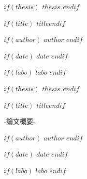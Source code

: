 \documentclass[10pt,a4paper,dvipdfmx]{jreport}
\begin{document}
    \begin{center}
    {\fontsize{38pt}{40pt}\selectfont \bf $if(thesis)$ $thesis$ $endif$ \par} %
        \vspace{5cm}

        {\fontsize{30pt}{40pt}\selectfont
        \bf $if(title)$ $title$$endif$ \par }%
        \vspace{1cm}

        {\fontsize{30pt}{40pt}\selectfont
        $if(author)$ $author$ $endif$ \par }%
        \vspace{1cm}

        {\fontsize{20pt}{10pt}\selectfont
        $if(date)$ $date$ $endif$ \par }%
        \vspace{8cm}
        {\fontsize{20pt}{10pt}\selectfont
        $if(labo)$ $labo$ $endif$ \par }

    \end{center}
    \thispagestyle{empty}
    \clearpage

    \begin{center}
    {\fontsize{38pt}{40pt}\selectfont \bf $if(thesis)$ $thesis$ $endif$ \par} %
        \vspace{5cm}

        {\fontsize{30pt}{40pt}\selectfont
        \bf $if(title)$ $title$$endif$ \par }%
        \vspace{1cm}
        {\fontsize{30pt}{40pt}\selectfont
        -論文概要- \par }
        {\fontsize{30pt}{40pt}\selectfont
        $if(author)$ $author$ $endif$ \par }%
        \vspace{1cm}

        {\fontsize{20pt}{10pt}\selectfont
        $if(date)$ $date$ $endif$ \par }%
        \vspace{6cm}
        {\fontsize{20pt}{10pt}\selectfont
        $if(labo)$ $labo$ $endif$ \par }
    \end{center}
\end{document}
